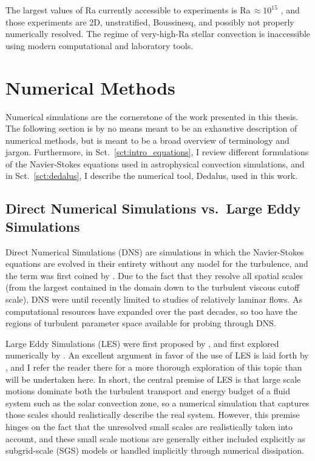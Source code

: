 The largest values of Ra currently accessible to experiments is Ra$\,\approx 10^{15}$ \citep{zhu&all2018}, and those experiments are 2D, unstratified, Boussinesq, and possibly not properly numerically resolved.
The regime of very-high-Ra stellar convection is inaccessible using modern computational and laboratory tools.


\section{Numerical Methods}
\label{sct:numerics}
Numerical simulations are the cornerstone of the work presented in this thesis.
The following section is by no means meant to be an exhaustive description of numerical methods, but is meant to be a broad overview of terminology and jargon.
Furthermore, in Sct.~\ref{sct:intro_equations}, I review different formulations of the Navier-Stokes equations used in astrophysical convection simulations, and in Sct.~\ref{sct:dedalus}, I describe the numerical tool, Dedalus, used in this work. 

\subsection{Direct Numerical Simulations vs.~Large Eddy Simulations}
Direct Numerical Simulations (DNS) are simulations in which the Navier-Stokes equations are evolved in their entirety without any model for the turbulence, and the term was first coined by \citet{orszag1970}.
Due to the fact that they resolve all spatial scales (from the largest contained in the domain down to the turbulent viscous cutoff scale), DNS were until recently limited to studies of relatively laminar flows.
As computational resources have expanded over the past decades, so too have the regions of turbulent parameter space available for probing through DNS.


Large Eddy Simulations (LES) were first proposed by \cite{smagorinsky1963}, and first explored numerically by \citet{deardorff1970}.
An excellent argument in favor of the use of LES is laid forth by \citet{miesch&all2015}, and I refer the reader there for a more thorough exploration of this topic than will be undertaken here.
In short, the central premise of LES is that large scale motions dominate both the turbulent transport and energy budget of a fluid system such as the solar convection zone, so a numerical simulation that captures those scales should realistically describe the real system.
However, this premise hinges on the fact that the unresolved small scales are realistically taken into account, and these small scale motions are generally either included explicitly as subgrid-scale (SGS) models or handled implicitly through numerical dissipation.


